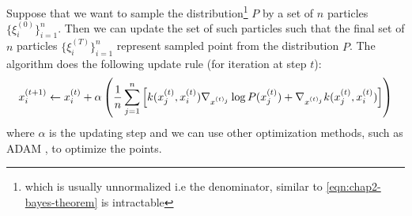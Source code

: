 Suppose that we want to sample the distribution\footnote{which is usually unnormalized i.e the denominator, similar to \ref{eqn:chap2-bayes-theorem} is intractable} $P$ by a set of $n$ particles $\{\xi^{(0)}_i\}^n_{i=1}$. Then we can update the set of such particles such that the final set of $n$ particles $\{\xi^{(T)}_i\}^n_{i=1}$ represent sampled point from the distribution $P$. The algorithm does the following update rule (for iteration at step $t$): 
\begin{equation}
    x^{(t+1)}_i \leftarrow x^{(t)}_i + \alpha \left( \frac{1}{n}\sum^n_{j=1} \left[ k(x^{(t)}_j, x^{(t)}_i) \nabla_{x^{(t)_j}} \log P(x^{(t)}_j) + \nabla_{x^{(t)_j}} k (x^{(t)}_j, x^{(t)}_i)  \right] \right)
\end{equation}
where $\alpha$ is the updating step and we can use other optimization methods, such as ADAM \cite{kingma2014adam}, to optimize the points. 


